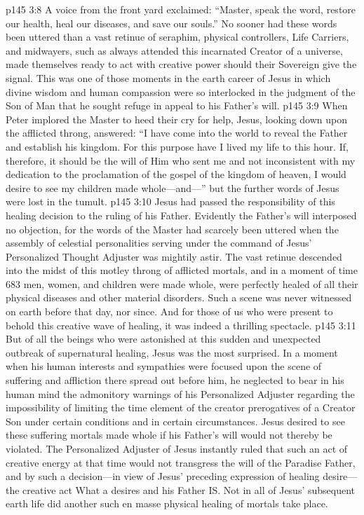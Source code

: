 \vs p145 3:8 A voice from the front yard exclaimed: “Master, speak the word, restore our health, heal our diseases, and save our souls.” No sooner had these words been uttered than a vast retinue of seraphim, physical controllers, Life Carriers, and midwayers, such as always attended this incarnated Creator of a universe, made themselves ready to act with creative power should their Sovereign give the signal. This was one of those moments in the earth career of Jesus in which divine wisdom and human compassion were so interlocked in the judgment of the Son of Man that he sought refuge in appeal to his Father’s will.
\vs p145 3:9 When Peter implored the Master to heed their cry for help, Jesus, looking down upon the afflicted throng, answered: \textcolor{ubdarkred}{“I have come into the world to reveal the Father and establish his kingdom. For this purpose have I lived my life to this hour. If, therefore, it should be the will of Him who sent me and not inconsistent with my dedication to the proclamation of the gospel of the kingdom of heaven, I would desire to see my children made whole---and---”} but the further words of Jesus were lost in the tumult.
\vs p145 3:10 Jesus had passed the responsibility of this healing decision to the ruling of his Father. Evidently the Father’s will interposed no objection, for the words of the Master had scarcely been uttered when the assembly of celestial personalities serving under the command of Jesus’ Personalized Thought Adjuster was mightily astir. The vast retinue descended into the midst of this motley throng of afflicted mortals, and in a moment of time 683 men, women, and children were made whole, were perfectly healed of all their physical diseases and other material disorders. Such a scene was never witnessed on earth before that day, nor since. And for those of us who were present to behold this creative wave of healing, it was indeed a thrilling spectacle.
\pc \vs p145 3:11 But of all the beings who were astonished at this sudden and unexpected outbreak of supernatural healing, Jesus was the most surprised. In a moment when his human interests and sympathies were focused upon the scene of suffering and affliction there spread out before him, he neglected to bear in his human mind the admonitory warnings of his Personalized Adjuster regarding the impossibility of limiting the time element of the creator prerogatives of a Creator Son under certain conditions and in certain circumstances. Jesus desired to see these suffering mortals made whole if his Father’s will would not thereby be violated. The Personalized Adjuster of Jesus instantly ruled that such an act of creative energy at that time would not transgress the will of the Paradise Father, and by such a decision---in view of Jesus’ preceding expression of healing desire---the creative act  What a  desires and his Father  IS. Not in all of Jesus’ subsequent earth life did another such en masse physical healing of mortals take place.
